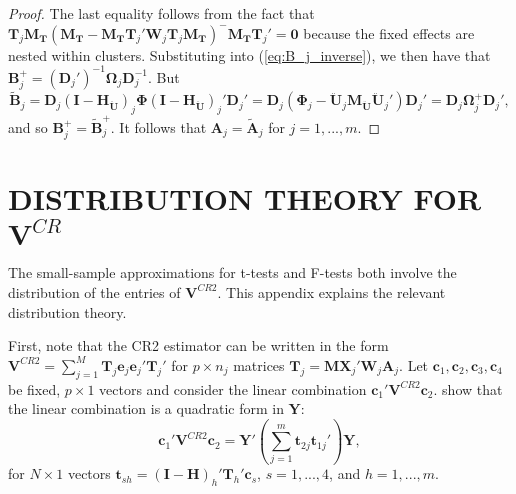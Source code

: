 \documentclass[12pt]{article}\usepackage[]{graphicx}\usepackage[]{color}
\newcommand{\bm}{\mathbf}
\newcommand{\bs}{\boldsymbol}
\begin{document}
\begin{proof}
The last equality follows from the fact that $\bm{T}_j \bm{M_T}\left(\bm{M_T} - \bm{M_T}\bm{T}_j' \bm{W}_j \bm{T}_j\bm{M_T}\right)^{-} \bm{M_T} \bm{T}_j' = \bm{0}$ because the fixed effects are nested within clusters. 
Substituting into (\ref{eq:B_j_inverse}), we then have that $\bm{B}_j^+ = \left(\bm{D}_j'\right)^{-1} \bs\Omega_j \bm{D}_j^{-1}$. 
But \[
\bm{\tilde{B}}_j = \bm{D}_j \left(\bm{I} - \bm{H_{\ddot{U}}}\right)_j \bs\Phi \left(\bm{I} - \bm{H_{\ddot{U}}}\right)_j' \bm{D}_j' = \bm{D}_j \left(\bs\Phi_j - \bm{\ddot{U}}_j\bm{M_{\ddot{U}}} \bm{\ddot{U}}_j'\right) \bm{D}_j' = \bm{D}_j \bs\Omega_j^+ \bm{D}_j',
\]
and so $\bm{B}_j^+ = \bm{\tilde{B}}_j^+$. It follows that $\bm{A}_j = \bm{\tilde{A}}_j$ for $j = 1,...,m$. 
\end{proof}

\section{DISTRIBUTION THEORY FOR $\bm{V}^{CR}$}
\label{app:VCR_dist}

The small-sample approximations for t-tests and F-tests both involve the distribution of the entries of $\bm{V}^{CR2}$. This appendix explains the relevant distribution theory.

First, note that the CR2 estimator can be written in the form $\bm{V}^{CR2} = \sum_{j=1}^M \bm{T}_j \bm{e}_j \bm{e}_j' \bm{T}_j'$ for $p \times n_j$ matrices $\bm{T}_j = \bm{M} \bm{X}_j' \bm{W}_j \bm{A}_j$.
Let $\bm{c}_1,\bm{c}_2,\bm{c}_3,\bm{c}_4$ be fixed, $p \times 1$ vectors and consider the linear combination $\bm{c}_1' \bm{V}^{CR2} \bm{c}_2$. 
\citet[Theorem 4]{Bell2002bias} show that the linear combination is a quadratic form in $\bm{Y}$: \[
\bm{c}_1' \bm{V}^{CR2} \bm{c}_2 = \bm{Y}'\left(\sum_{j=1}^m \bm{t}_{2j} \bm{t}_{1j}'\right) \bm{Y}, \]
for $N \times 1$ vectors $\bm{t}_{sh} = \left(\bm{I} - \bm{H}\right)_h' \bm{T}_h' \bm{c}_s$, $s = 1,...,4$, and $h = 1,...,m$. 
\end{document}
